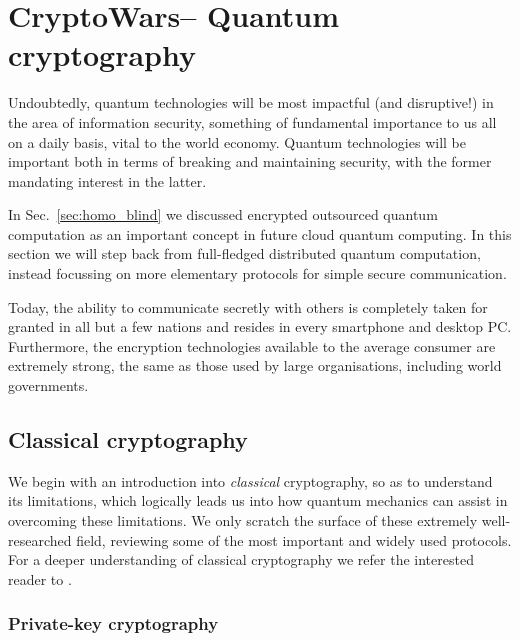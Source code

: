 %
%

\section{CryptoWars\texttrademark -- Quantum cryptography}\label{sec:cryptowars}

Undoubtedly, quantum technologies will be most impactful (and disruptive!) in the area of information security, something of fundamental importance to us all on a daily basis, vital to the world economy. Quantum technologies will be important both in terms of breaking and maintaining security, with the former mandating interest in the latter.

In Sec.~\ref{sec:homo_blind} we discussed encrypted outsourced quantum computation as an important concept in future cloud quantum computing. In this section we will step back from full-fledged distributed quantum computation, instead focussing on more elementary protocols for simple secure communication.

Today, the ability to communicate secretly with others is completely taken for granted in all but a few nations and resides in every smartphone and desktop PC. Furthermore, the encryption technologies available to the average consumer are extremely strong, the same as those used by large organisations, including world governments.

%
%

\subsection{Classical cryptography}

We begin with an introduction into \textit{classical} cryptography, so as to understand its limitations, which logically leads us into how quantum mechanics can assist in overcoming these limitations. We only scratch the surface of these extremely well-researched field, reviewing some of the most important and widely used protocols. For a deeper understanding of classical cryptography we refer the interested reader to \cite{bib:Schneier96}.

%
%

\subsubsection{Private-key cryptography}

